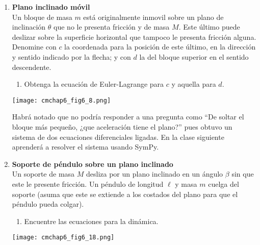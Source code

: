 \documentclass[11pt, a4paper, twoside]{article}
\begin{document}
\begin{enumerate}
\item
	\begin{minipage}[t][3.85cm]{0.7\textwidth}
		\textbf{Plano inclinado móvil}\\
		Un bloque de masa \(m\) está originalmente inmovil sobre un plano de inclinación \(\theta\) que no le presenta fricción y de masa \(M\).
		Este último puede deslizar sobre la superficie horizontal que tampoco le presenta fricción alguna.
		Denomine con \(c\) la coordenada para la posición de este último, en la dirección y sentido indicado por la flecha; y con \(d\) la del bloque superior en el sentido descendente.
		\begin{enumerate}
			\item Obtenga la ecuación de Euler-Lagrange para \(c\) y aquella para \(d\).
		\end{enumerate}
	\end{minipage}
	\begin{minipage}[c][0cm][t]{0.3\textwidth}
		\texttt{[image: cmchap6\_fig6\_8.png]}
	\end{minipage}
	Habrá notado que no podría responder a una pregunta como ``De soltar el bloque más pequeño, ¿que aceleración tiene el plano?'' pues obtuvo un sistema de dos ecuaciones diferenciales ligadas.
	En la clase siguiente aprenderá a resolver el sistema usando SymPy. 

\item
	\begin{minipage}[t][3.5cm]{0.7\textwidth}
		\textbf{Soporte de péndulo sobre un plano inclinado}\\
		Un soporte de masa \(M\) desliza por un plano inclinado en un ángulo \(\beta\) sin que este le presente fricción.
		Un péndulo de longitud \(\ell\) y masa \(m\) cuelga del soporte (asuma que este se extiende a los costados del plano para que el péndulo pueda colgar).
		\begin{enumerate}
			\item Encuentre las ecuaciones para la dinámica.
		\end{enumerate}
	\end{minipage}
	\begin{minipage}[c][1cm][t]{0.3\textwidth}
		\texttt{[image: cmchap6\_fig6\_18.png]}
	\end{minipage}




\end{enumerate}
\end{document}
